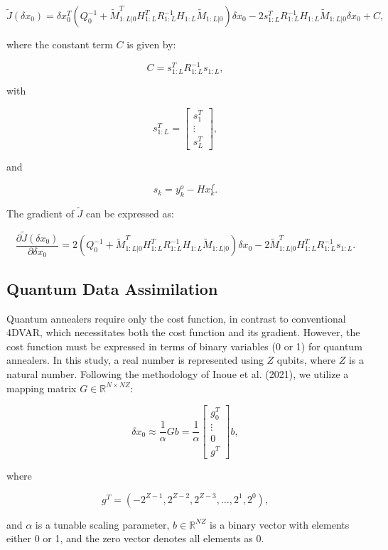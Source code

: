 \documentclass{article}
\begin{document}
\[
\tilde{J}(\delta x_0) = \delta x_0^T \left( Q_0^{-1} + \tilde{M}^T_{1:L|0} H^T_{1:L} R_{1:L}^{-1} H_{1:L} \tilde{M}_{1:L|0} \right) \delta x_0 - 2 s^T_{1:L} R_{1:L}^{-1} H_{1:L} \tilde{M}_{1:L|0} \delta x_0 + C,
\]

where the constant term \( C \) is given by:

\[
C = s^T_{1:L} R_{1:L}^{-1} s_{1:L},
\]

with

\[
s^T_{1:L} = \begin{bmatrix}
s^T_1 \\
\vdots \\
s^T_L
\end{bmatrix},
\]

and 

\[
s_k = y^o_k - H x^f_k.
\]

The gradient of \( \tilde{J} \) can be expressed as:

\[
\frac{\partial \tilde{J}(\delta x_0)}{\partial \delta x_0} = 2 \left( Q_0^{-1} + \tilde{M}^T_{1:L|0} H^T_{1:L} R_{1:L}^{-1} H_{1:L} \tilde{M}_{1:L|0} \right) \delta x_0 - 2 \tilde{M}^T_{1:L|0} H^T_{1:L} R_{1:L}^{-1} s_{1:L}.
\]

\subsection{Quantum Data Assimilation}

Quantum annealers require only the cost function, in contrast to conventional 4DVAR, which necessitates both the cost function and its gradient. However, the cost function must be expressed in terms of binary variables (0 or 1) for quantum annealers. In this study, a real number is represented using \( Z \) qubits, where \( Z \) is a natural number. Following the methodology of Inoue et al. (2021), we utilize a mapping matrix \( G \in \mathbb{R}^{N \times NZ} \):

\[
\delta x_0 \approx \frac{1}{\alpha} G b = \frac{1}{\alpha} \begin{bmatrix}
g^T_0 \\
\vdots \\
0 \\
g^T
\end{bmatrix} b,
\]

where 

\[
g^T = \left( -2^{Z-1}, 2^{Z-2}, 2^{Z-3}, \ldots, 2^1, 2^0 \right),
\]

and \( \alpha \) is a tunable scaling parameter, \( b \in \mathbb{R}^{NZ} \) is a binary vector with elements either 0 or 1, and the zero vector denotes all elements as 0.
\end{document}
